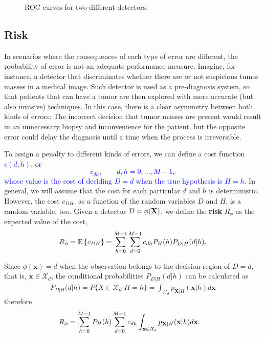 \begin{figure}
\begin{center}

\end{center}
\caption{ROC curves for two different detectors.\label{fig:ROC}}
\end{figure}

\subsection{Risk}

In scenarios where the consequences of each type of error are different, the probability of error is not an adequate performance measure. Imagine, for instance, a detector that discriminates whether there are or not suspicious tumor masses in a medical image. Such detector is used as a pre-diagnosis system, so that patients that can have a tumor are then explored with more accurate (but also invasive) techniques. In this case, there is a clear asymmetry between both kinds of errors: The incorrect decision that tumor masses are present would result in an unnecessary biopsy and inconvenience for the patient, but the opposite error could delay the diagnosis until a time when the process is irreversible.

To assign a penalty to different kinds of errors, we can define a cost function \textcolor{blue}{$c(d, h)$, or 
$$c_{dh}, \qquad d,h = 0, \ldots, M-1,$$
whose value is the cost of deciding $D=d$ when the true hypothesis is $H=h$}. In general, we will assume that the cost for each particular $d$ and $h$ is deterministic. However, the cost $c_{DH}$, as a function of the random variables $D$ and $H$, is a random variable, too. 
Given a detector $D = \phi({\bf X})$, we define the \textbf{risk} $R_\phi$ as the expected value of the cost,
\begin{align}
\label{eq:def_Drisk}
R_\phi = \mathbb{E}\left\{c_{DH}\right\} = \sum_{h=0}^{M-1} \sum_{d=0}^{M-1} c_{dh} P_H(h) P_{D|H}(d|h).
\end{align}

Since $\phi(\mathbf{x})=d$ when the observation belongs to the decision region of $D=d$, that is, $\mathbf{x} \in \mathcal{X}_d$, the conditional probabilities $P_{D|H}(d|h)$ can be calculated as
\begin{align}
\label{eq:PDgivenH}
P_{D|H}(d|h) = P\{X \in \mathcal{X}_d | H=h \}
             = \int_{\mathcal{X}_d} p_{\mathbf{X}|H}(\mathbf{x}|h) d\mathbf{x}
\end{align}
therefore
\begin{align}
R_\phi 
	& = \sum_{h=0}^{M-1} P_H(h) \sum_{d=0}^{M-1} c_{dh} 
	                     \int_{{\bf x}\in {\cal X}_d} p_{{\bf X}|H}({\bf x}|h) d{\bf x}.
\end{align}

